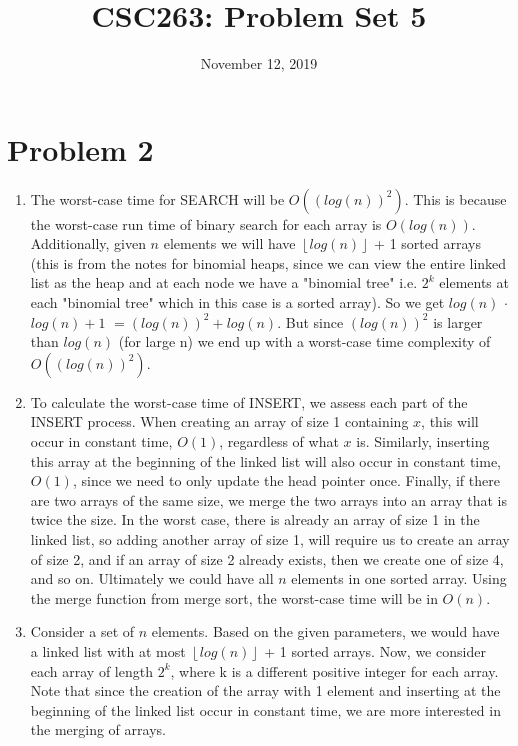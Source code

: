 \documentclass{article}
\title{CSC263: Problem Set 5}
\date{November 12, 2019}
\begin{document}
\maketitle

\section{Problem 2}

\begin{enumerate}[label=(\alph*)]

\item The worst-case time for SEARCH will be $O((log(n))^2)$. This is because the worst-case run time of binary search for each array is $O(log(n))$. Additionally, given $n$ elements we will have ${\left\lfloor log(n)\right\rfloor}$ + 1 sorted arrays (this is from the notes for binomial heaps, since we can view the entire linked list as the heap and at each node we have a "binomial tree" i.e. $2^k$ elements at each "binomial tree" which in this case is a sorted array). So we get $log(n)$ $\cdot$ $log(n) + 1$ $= (log(n))^2 + log(n)$. But since $(log(n))^2$ is larger than $log(n)$ (for large n) we end up with a worst-case time complexity of $O((log(n))^2)$.

\item To calculate the worst-case time of INSERT, we assess each part of the INSERT process. When creating an array of size 1 containing $x$, this will occur in constant time, $O(1)$, regardless of what $x$ is. Similarly, inserting this array at the beginning of the linked list will also occur in constant time, $O(1)$, since we need to only update the head pointer once. Finally, if there are two arrays of the same size, we merge the two arrays into an array that is twice the size. In the worst case, there is already an array of size 1 in the linked list, so adding another array of size 1, will require us to create an array of size 2, and if an array of size 2 already exists, then we create one of size 4, and so on. Ultimately we could have all $n$ elements in one sorted array. Using the merge function from merge sort, the worst-case time will be in $O(n)$.

\item Consider a set of $n$ elements. Based on the given parameters, we would have a linked list with at most ${\left\lfloor log(n)\right\rfloor}$ + 1 sorted arrays. Now, we consider each array of length $2^k$, where k is a different positive integer for each array. Note that since the creation of the array with 1 element and inserting at the beginning of the linked list occur in constant time, we are more interested in the merging of arrays.


\end{enumerate}
\end{document}
